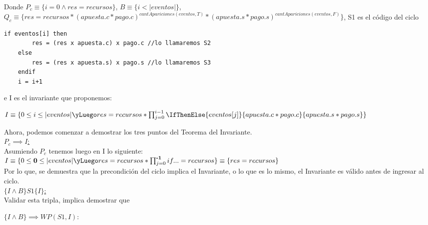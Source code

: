 \documentclass[10pt,a4paper]{article}
\begin{document}
Donde  $P_{c}\equiv \{i=0 \wedge res=recursos\}$, $B \equiv \{i < |eventos|\}$, $Q_{c}\equiv \{ res = recursos * (apuesta.c * pago.c)^{cantApariciones(eventos,T)}*(apuesta.s * pago.s)^{cantApariciones(eventos,F)}\}$, S1 es el código del ciclo
 \vspace{5mm}
\begin{lstlisting}[caption={Lo llamaremos S1 en los siguientes pasos.},label=code:for]
	if eventos[i] then
        res = (res x apuesta.c) x pago.c //lo llamaremos S2
    else
        res = (res x apuesta.s) x pago.s //lo llamaremos S3
    endif
    i = i+1
	\end{lstlisting}

e I es el invariante que proponemos:
 \begin{center}
 $I \equiv \{0 \leq i \leq |eventos| \yLuego res = recursos *
 \prod_{j=0}^{i-1} \IfThenElse{eventos[j]}{apuesta.c * pago.c}{apuesta.s * pago.s} \}$
 \end{center}
  \vspace{5mm}
Ahora, podemos comenzar a demostrar los tres puntos del Teorema del Invariante. 
\vspace{5mm}
\\
\underline{$P_{c} \implies I$:}
\vspace{5mm}
\\
Asumiendo $P_{c}$ tenemos luego en I lo siguiente:
\vspace{5mm}
\\
$I \equiv \{0 \leq \textbf{0} \leq |eventos| \yLuego res = recursos *
 \prod_{j=0}^{\textbf{-1}}if... = recursos \} \equiv \{ res = recursos \}$ 
\vspace{5mm}
\\
Por lo que, se demuestra que la precondición del ciclo implica el Invariante, o lo que es lo mismo, el Invariante es válido antes de ingresar al ciclo.
\vspace{5mm}
\\
\underline{$\{I \wedge B\} S1 \{I\}$:}
\vspace{5mm}
\\
Validar esta tripla, implica demostrar que 
 \begin{center}
$\{I \wedge B\} \implies WP(S1,I)$:
 \end{center}
\end{document}
